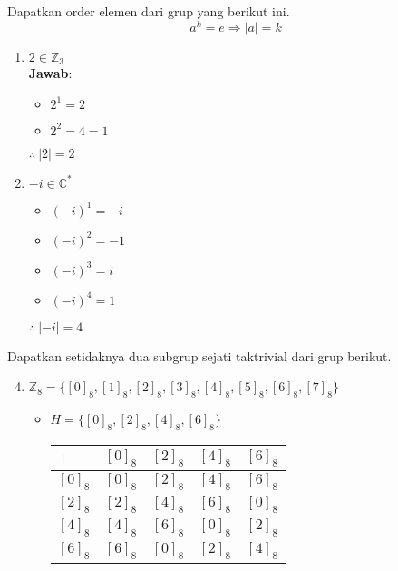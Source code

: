 \documentclass{article}
\begin{document}
\begin{myitems}
    \item Dapatkan order elemen dari grup yang berikut ini.
    \[a^k=e\Rightarrow|a|=k\]
    \begin{enumerate}[label=\fbox{\arabic*}]
        \item $2\in\mathbb{Z}_3$\\
        \textbf{Jawab}:
        \begin{itemize}
            \item $2^1=2$
            \item $2^2=4=1$
        \end{itemize}
        $\therefore\:|2|=2$
        \setcounter{enumi}{7}
        \item $-i\in\mathbb{C}^*$
         \begin{itemize}
            \item $(-i)^1=-i$
            \item $(-i)^2=-1$
            \item $(-i)^3=i$
            \item $(-i)^4=1$
        \end{itemize}
        $\therefore\:|-i|=4$
    \end{enumerate}
    \item Dapatkan setidaknya dua subgrup sejati taktrivial dari grup berikut.
    \begin{enumerate}[label=\fbox{\arabic*}]
    \setcounter{enumi}{3}
    \item $\mathbb{Z}_8=\{[0]_8,[1]_8,[2]_8,[3]_8,[4]_8,[5]_8,[6]_8,[7]_8\}$
    \begin{itemize}
        \item $H=\{[0]_8,[2]_8,[4]_8,[6]_8\}$
        \begin{center}
        \begin{tabular}{|l|| c c c c|} 
        \hline
        \rowcolor{cyan}
         \color{purple}$+$ & $[0]_8$ & $[2]_8$ & $[4]_8$ & $[6]_8$ \\
         \hline\hline
             $[0]_8$ & $[0]_8$ & $[2]_8$ & $[4]_8$ & $[6]_8$ \\
             $[2]_8$ & $[2]_8$ & $[4]_8$ & $[6]_8$ & $[0]_8$ \\
             $[4]_8$ & $[4]_8$ & $[6]_8$ & $[0]_8$ & $[2]_8$ \\
             $[6]_8$ & $[6]_8$ & $[0]_8$ & $[2]_8$ & $[4]_8$ \\
        \end{tabular}

\end{center}
\end{itemize}
\end{enumerate}
\end{myitems}
\end{document}
